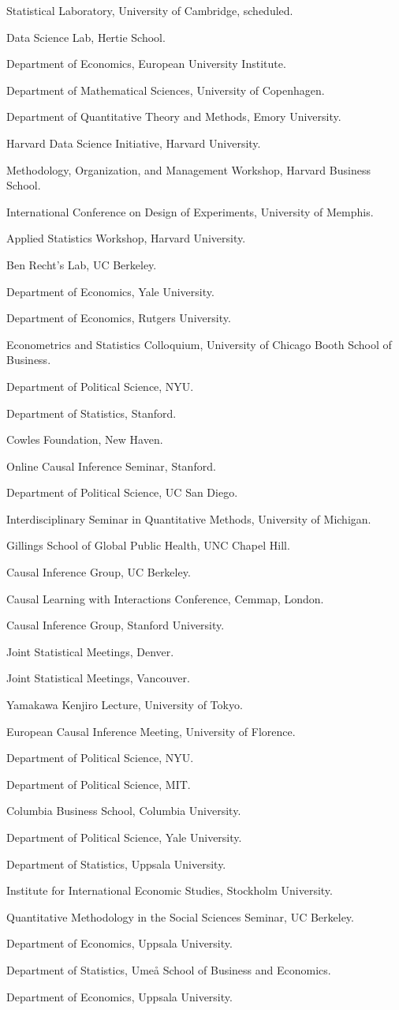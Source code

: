 \documentclass[10pt,letterpaper]{article}
\newenvironment{singledatelist}{
	\begin{list}{}{
		\setlength{\parskip}{0pt}
		\setlength{\itemsep}{4pt}
		\setlength{\parsep}{0.3em}
		\setlength{\leftmargin}{3.5em}
		\setlength{\labelwidth}{3.5em}
		\setlength{\labelsep}{1.5em}
		}
	}{
\end{list}
}
\newcommand{\dateitem}[2][]{\item[{#1}] {#2}}
\begin{document}
	\begin{singledatelist}
		\dateitem[2025]{Statistical Laboratory, University of Cambridge, scheduled.}
		\dateitem[2024]{Data Science Lab, Hertie School.}
		\dateitem{Department of Economics, European University Institute.}
		\dateitem{Department of Mathematical Sciences, University of Copenhagen.}
		\dateitem{Department of Quantitative Theory and Methods, Emory University.}
		\dateitem{Harvard Data Science Initiative, Harvard University.}
		\dateitem[2023]{Methodology, Organization, and Management Workshop, Harvard Business School.}
		\dateitem{International Conference on Design of Experiments, University of Memphis.}
		\dateitem{Applied Statistics Workshop, Harvard University.}
		\dateitem{Ben Recht's Lab, UC Berkeley.}
		\dateitem{Department of Economics, Yale University.}
		\dateitem[2021]{Department of Economics, Rutgers University.}
		\dateitem{Econometrics and Statistics Colloquium, University of Chicago Booth School of Business.}
		\dateitem{Department of Political Science, NYU.}
		\dateitem{Department of Statistics, Stanford.}
		\dateitem{Cowles Foundation, New Haven.}
		\dateitem{Online Causal Inference Seminar, Stanford.}
		\dateitem[2020]{Department of Political Science, UC San Diego.}
		\dateitem{Interdisciplinary Seminar in Quantitative Methods, University of Michigan.}
		\dateitem{Gillings School of Global Public Health, UNC Chapel Hill.}
		\dateitem{Causal Inference Group, UC Berkeley.}
		\dateitem[2019]{Causal Learning with Interactions Conference, Cemmap, London.}
		\dateitem{Causal Inference Group, Stanford University.}
		\dateitem{Joint Statistical Meetings, Denver.}
		\dateitem[2018]{Joint Statistical Meetings, Vancouver.}
		\dateitem{Yamakawa Kenjiro Lecture, University of Tokyo.}
		\dateitem{European Causal Inference Meeting, University of Florence.}
		\dateitem{Department of Political Science, NYU.}
		\dateitem{Department of Political Science, MIT.}
		\dateitem[2016]{Columbia Business School, Columbia University.}
		\dateitem[2015]{Department of Political Science, Yale University.}
		\dateitem{Department of Statistics, Uppsala University.}
		\dateitem{Institute for International Economic Studies, Stockholm University.}
		\dateitem[2014]{Quantitative Methodology in the Social Sciences Seminar, UC Berkeley.}
		\dateitem{Department of Economics, Uppsala University.}
		\dateitem[2013]{Department of Statistics, Umeå School of Business and Economics.}
		\dateitem[2012]{Department of Economics, Uppsala University.}
	\end{singledatelist}
\end{document}
